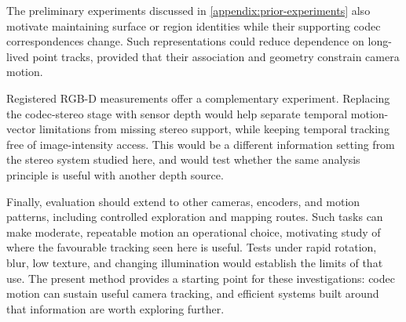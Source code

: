 The preliminary experiments discussed in
\autoref{appendix:prior-experiments} also motivate maintaining surface or
region identities while their supporting codec correspondences change.
Such representations could reduce dependence on long-lived point tracks,
provided that their association and geometry constrain camera motion.

Registered RGB-D measurements offer a complementary experiment. Replacing the
codec-stereo stage with sensor depth would help separate temporal motion-vector
limitations from missing stereo support, while keeping temporal tracking free
of image-intensity access. This would be a different information setting from
the stereo system studied here, and would test whether the same analysis
principle is useful with another depth source.

Finally, evaluation should extend to other cameras, encoders, and motion
patterns, including controlled exploration and mapping routes. Such tasks can
make moderate, repeatable motion an operational choice, motivating study of
where the favourable tracking seen here is useful. Tests under rapid rotation,
blur, low texture, and changing illumination would establish the limits of that
use. The present method provides a starting point for these investigations:
codec motion can sustain useful camera tracking, and efficient systems built
around that information are worth exploring further.
